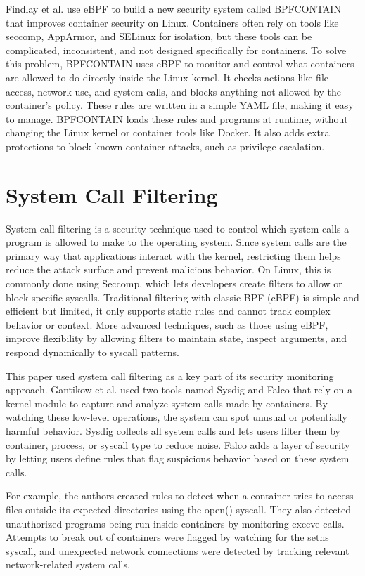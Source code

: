 \documentclass[12pt]{report}
\begin{document}
\begin{doublespace}
Findlay et al. \cite{findlay2021bpfcontain} use eBPF to build a new security system called BPFCONTAIN that improves container security on Linux. Containers often rely on tools like seccomp, AppArmor, and SELinux for isolation, but these tools can be complicated, inconsistent, and not designed specifically for containers. To solve this problem, BPFCONTAIN uses eBPF to monitor and control what containers are allowed to do directly inside the Linux kernel. It checks actions like file access, network use, and system calls, and blocks anything not allowed by the container’s policy. These rules are written in a simple YAML file, making it easy to manage. BPFCONTAIN loads these rules and programs at runtime, without changing the Linux kernel or container tools like Docker. It also adds extra protections to block known container attacks, such as privilege escalation.


\section{System Call Filtering}

System call filtering is a security technique used to control which system calls a program is allowed to make to the operating system. Since system calls are the primary way that applications interact with the kernel, restricting them helps reduce the attack surface and prevent malicious behavior. On Linux, this is commonly done using Seccomp, which lets developers create filters to allow or block specific syscalls. Traditional filtering with classic BPF (cBPF) is simple and efficient but limited, it only supports static rules and cannot track complex behavior or context. More advanced techniques, such as those using eBPF, improve flexibility by allowing filters to maintain state, inspect arguments, and respond dynamically to syscall patterns. 

This paper used system call filtering as a key part of its security monitoring approach. Gantikow et al. \cite{gantikow2019rule} used two tools named Sysdig and Falco that rely on a kernel module to capture and analyze system calls made by containers. By watching these low-level operations, the system can spot unusual or potentially harmful behavior. Sysdig collects all system calls and lets users filter them by container, process, or syscall type to reduce noise. Falco adds a layer of security by letting users define rules that flag suspicious behavior based on these system calls.

For example, the authors created rules to detect when a container tries to access files outside its expected directories using the open() syscall. They also detected unauthorized programs being run inside containers by monitoring execve calls. Attempts to break out of containers were flagged by watching for the setns syscall, and unexpected network connections were detected by tracking relevant network-related system calls.


\end{doublespace}
\end{document}
